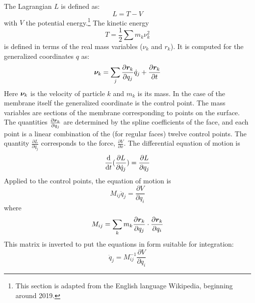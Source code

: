 
 \label{sec:hamilton}



The Lagrangian $L$ is defined as:
\begin{equation}
L = T - V
\end{equation}
with $V$ the potential energy.\footnote{This section is adapted from the English language Wikipedia, beginning around 2019.}
The kinetic energy
\begin{equation}
T = \frac{1}{2} \sum m_k \nu_k^2
\end{equation}
is defined in terms of the real mass variables ($\nu_k$ and $r_k$). 
It is computed for the generalized coordinates $q$ as:
\begin{equation}
\boldsymbol{\nu}_k = \sum_j{\frac{\partial \boldsymbol{r}_k}{\partial q_j} \dot{q}_j} + \frac{\partial \boldsymbol{r}_k}{\partial t}
\end{equation}
Here $\boldsymbol{\nu}_k$ is the velocity of particle $k$ and $m_k$ is its mass.
In the case of the membrane itself the generalized coordinate is the control point.
The mass variables are sections of the membrane corresponding to points on the surface.
The quantities $\frac{\partial \boldsymbol{r}_k}{\partial q_j}$ are determined by the spline coefficients of the face, and each point is a linear combination of the (for regular faces) twelve control points.
The quantity $\frac{\partial L}{\partial q_j}$ corresponds to the force, $\frac{\partial V}{\partial x}$.
The differential equation of motion is 
\begin{equation}
\frac{\textrm{d}}{\textrm{d}t} {\huge (} \frac{\partial L}{\partial \dot{q}_j} {\huge )} = \frac{\partial L}{\partial q_j}
\end{equation}
Applied to the control points, the equation of motion is
\begin{equation}
M_{ij} \ddot{q}_j = \frac{\partial V}{\partial q_i}
\end{equation}
where 
\begin{equation}
M_{ij} = \sum_k m_k \frac{ \partial { \boldsymbol{r}_k } }{\partial q_j} \cdot \frac{\partial{\boldsymbol{r}_k}}{\partial q_i}
\end{equation}
This matrix is inverted to put the equations in form suitable for integration:
\begin{equation}
\ddot{q}_j = M^{-1}_{ij} \frac{\partial V}{\partial q_i}
\end{equation}


